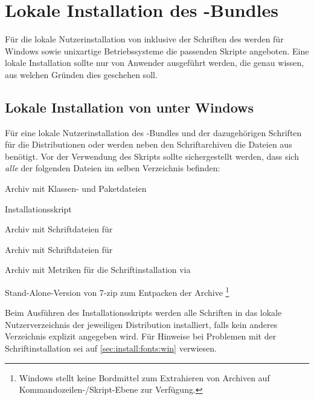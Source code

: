 \section{Lokale Installation des \TUDScript-Bundles}
\label{sec:local:install}
%
Für die lokale Nutzerinstallation von \TUDScript inklusive der Schriften des 
\CDs werden für Windows sowie unixartige Betriebssysteme die passenden Skripte 
angeboten. Eine lokale Installation sollte nur von Anwender ausgeführt werden, 
die genau wissen, aus welchen Gründen dies geschehen soll.


\subsection{Lokale Installation von \TUDScript unter Windows}
Für eine lokale Nutzerinstallation des \TUDScript-Bundles und der dazugehörigen 
Schriften für die Distributionen  oder 
 werden neben den Schriftarchiven die Dateien aus
%
{} benötigt. Vor der 
Verwendung des Skripts  sollte 
sichergestellt werden, dass sich \emph{alle} der folgenden Dateien im selben 
Verzeichnis befinden:
%
\settowidth{}%
\begin{description}[labelwidth=\tempdim,labelsep=1em]
  \item[\File{tudscr\_\vTUDScript.zip}]Archiv mit Klassen- und Paketdateien
  \item[\File{tudscr\_\vTUDScript\_install.bat}]Installationsskript
  \item[\File{Univers\_PS.zip}]Archiv mit Schriftdateien für \Univers
  \item[\File{DIN\_Bd\_PS.zip}]Archiv mit Schriftdateien für \DIN
  \item[\File{tudscrfonts.zip}]Archiv mit Metriken für die
    Schriftinstallation via 
  \item[\File{7za.exe}]Stand-Alone-Version von 7-zip zum Entpacken der Archive%
    \footnote{%
      Windows stellt keine Bordmittel zum Extrahieren von Archiven auf 
      Kommandozeilen-/Skript-Ebene zur Verfügung.%
    }%
\end{description}
%
Beim Ausführen des Installationsskripts werden alle Schriften in das lokale 
Nutzerverzeichnis der jeweiligen Distribution installiert, falls kein anderes 
Verzeichnis explizit angegeben wird. Für Hinweise bei Problemen mit der 
Schriftinstallation sei auf \autoref{sec:install:fonts:win} verwiesen.



